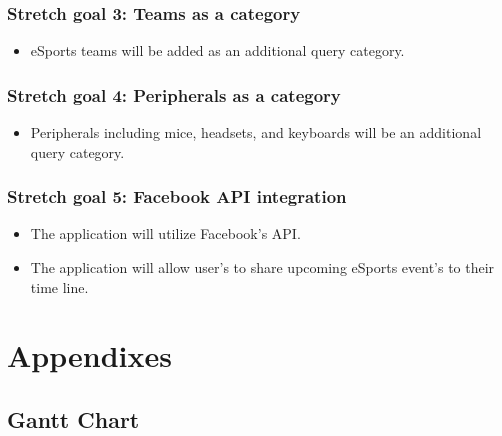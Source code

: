 \documentclass[onecolumn, draftclsnofoot,10pt, compsoc]{IEEEtran}
\begin{document}
\subsubsection{Stretch goal 3: Teams as a category}
\begin{itemize}
\item eSports teams will be added as an additional query category.
\end{itemize}

\subsubsection{Stretch goal 4: Peripherals as a category}
\begin{itemize}
\item Peripherals including mice, headsets, and keyboards will be an additional query category.
\end{itemize}

\subsubsection{Stretch goal 5: Facebook API integration}
\begin{itemize}
\item The application will utilize Facebook's API.
\item The application will allow user's to share upcoming eSports event's to their time line.
\end{itemize}

\section{Appendixes}
\subsection{Gantt Chart}
\begin{ganttchart}{1}{30}
     \\
     \\
     \\
     \\
     \\
     \\
     \\
     \\
     \\
     \\
    
    
\end{ganttchart}
\end{document}
